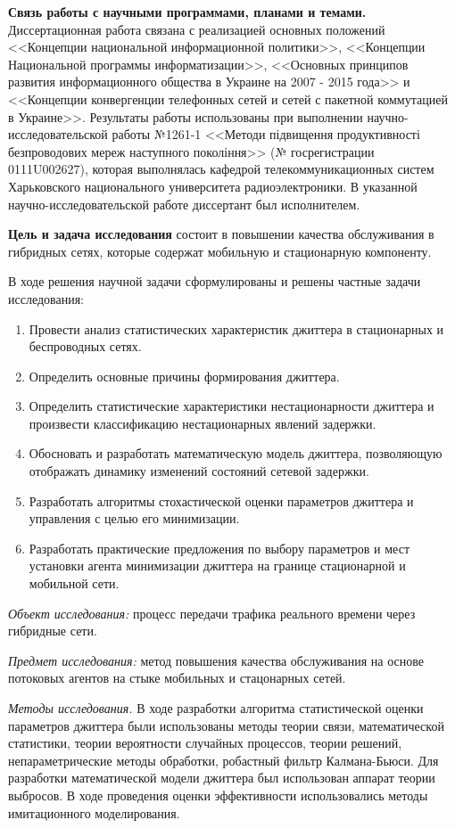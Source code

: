 \textbf{Связь работы с научными программами, планами и темами.} Диссертационная работа связана с реализацией основных положений <<Концепции национальной информационной политики>>, 
<<Концепции Национальной программы информатизации>>, <<Основных принципов развития информационного общества в Украине на 2007 - 2015 года>> и <<Концепции конвергенции телефонных сетей и сетей с пакетной коммутацией в Украине>>.
Результаты работы использованы при выполнении научно-исследовательской работы №1261-1 <<Методи підвищення продуктивності безпроводових мереж наступного покоління>> (№ госрегистрации 0111U002627), которая выполнялась кафедрой телекоммуникационных систем Харьковского национального университета радиоэлектроники. В указанной научно-исследовательской работе диссертант был исполнителем.

\textbf{Цель и задача исследования} состоит в повышении качества обслуживания в гибридных сетях, которые содержат мобильную и стационарную компоненту.

В ходе решения научной задачи сформулированы и решены частные задачи исследования:
\begin{enumerate}
  \item Провести анализ статистических характеристик джиттера в стационарных и беспроводных сетях.
  \item Определить основные причины формирования джиттера.
  \item Определить статистические характеристики нестационарности джиттера и произвести классификацию нестационарных явлений задержки.
  \item Обосновать и разработать математическую модель джиттера, позволяющую отображать динамику изменений состояний сетевой задержки.
  \item Разработать алгоритмы стохастической оценки параметров джиттера и управления с целью его минимизации.
  \item Разработать практические предложения по выбору параметров и мест установки агента минимизации джиттера на границе стационарной и мобильной сети.
\end{enumerate}

{\itshape Объект исследования:} процесс передачи трафика реального времени через гибридные сети.

{\itshape Предмет исследования:} метод повышения качества обслуживания на основе потоковых агентов на стыке мобильных и стацонарных сетей.

{\itshape Методы исследования.} 
В ходе разработки алгоритма статистической оценки параметров джиттера были использованы методы теории связи, математической статистики, теории вероятности случайных процессов, 
теории решений, непараметрические методы обработки, робастный фильтр Калмана-Бьюси. 
Для разработки математической модели джиттера был использован аппарат теории выбросов. 
В ходе проведения оценки эффективности использовались методы имитационного моделирования.


